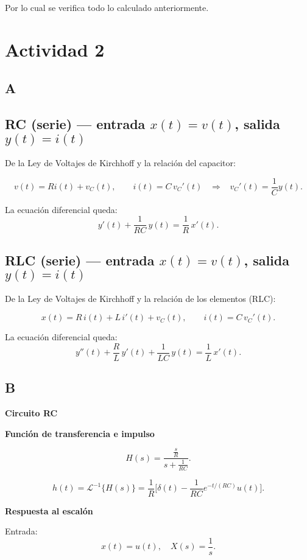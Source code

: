 Por lo cual se verifica todo lo calculado anteriormente.

\section{Actividad 2}

\subsection{A}

\subsection*{RC (serie) --- entrada $x(t) = v(t)$, salida $y(t) = i(t)$}

De la Ley de Voltajes de Kirchhoff y la relación del capacitor:

\[
v(t) = R i(t) + v_C(t), 
\qquad 
i(t) = C \, v_C'(t) 
\;\;\;\Rightarrow\;\;\;
v_C'(t) = \frac{1}{C} y(t).
\]

La ecuación diferencial queda:
\[
y'(t) + \frac{1}{RC}\,y(t) = \frac{1}{R}\,x'(t).
\]

\subsection*{RLC (serie) --- entrada $x(t) = v(t)$, salida $y(t) = i(t)$}

De la Ley de Voltajes de Kirchhoff y la relación de los elementos (RLC):

\[
x(t) = R\,i(t) + L\,i'(t) + v_C(t),
\qquad 
i(t) = C\,v_C'(t).
\]

La ecuación diferencial queda:
\[
y''(t) + \frac{R}{L}\,y'(t) + \frac{1}{LC}\,y(t) = \frac{1}{L}\,x'(t).
\]

\subsection{B}

\textbf{Circuito RC}

\textbf{Función de transferencia e impulso}

\[
H(s) = \frac{\tfrac{s}{R}}{s+\tfrac{1}{RC}}.
\]

\[
h(t) = \mathscr{L}^{-1}\{H(s)\} 
= \frac{1}{R}\Big[\delta(t)-\frac{1}{RC}e^{-t/(RC)}u(t)\Big].
\]

\textbf{Respuesta al escalón}

Entrada:
\[
x(t)=u(t), \quad X(s)=\frac{1}{s}.
\]

